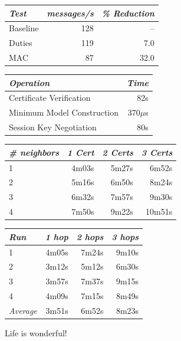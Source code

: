 \centering
  \begin{tabular}{|l|r|r|} \hline
    \textit{Test} \T & \textit{messages/s} & \textit{\% Reduction} \\
    \hline \hline

    Baseline \T & 128 &   -- \\ \hline 
    Duties   \T & 119 &  7.0 \\ \hline
    MAC      \T &  87 & 32.0 \\ \hline
  \end{tabular}
\stopslide


\centering
  \begin{tabular}{|l|r|} \hline
    \textit{Operation} \T & \textit{Time} \\ \hline \hline

    Certificate Verification     \T &  82s \\ \hline 
    Minimum Model Construction   \T & 370$\mu$s \\ \hline
    Session Key Negotiation      \T &  80s\\ \hline
  \end{tabular}
\stopslide


\centering
  \begin{tabular}{|l|r|r|r|} \hline
    \textit{\# neighbors} \T & \textit{1 Cert }
                             & \textit{2 Certs}
                             & \textit{3 Certs} \\ \hline \hline

    1 \T &  4m03s & 5m27s &  6m52s \\ \hline
    2 \T &  5m16s & 6m50s &  8m24s \\ \hline
    3 \T &  6m32s & 7m57s &  9m30s \\ \hline
    4 \T &  7m50s & 9m22s & 10m51s \\ \hline
  \end{tabular}
\stopslide


\centering
  \begin{tabular}{|l|r|r|r|} \hline
    \textit{Run} \T & \textit{1 hop }
                    & \textit{2 hops}
                    & \textit{3 hops} \\ \hline \hline

                   1 \T &  4m05s & 7m24s & 9m10s \\ \hline
                   2 \T &  3m12s & 5m12s & 6m30s \\ \hline
                   3 \T &  3m57s & 7m37s & 9m15s \\ \hline
                   4 \T &  4m09s & 7m15s & 8m49s \\ \hline
    \textit{Average} \T &  3m51s & 6m52s & 8m23s \\ \hline
  \end{tabular}
\stopslide


Life is wonderful!
\stopslide